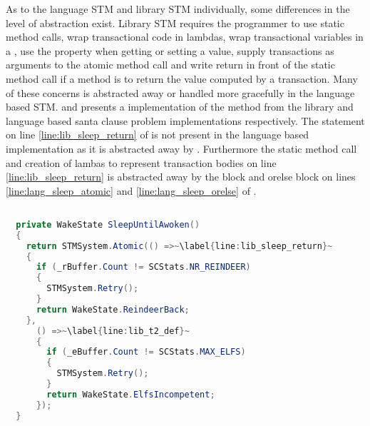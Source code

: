 As to the language \ac{STM} and library \ac{STM} individually, some differences in the level of abstraction exist. Library \ac{STM} requires the programmer to use static method calls, wrap transactional code in lambdas, wrap transactional variables in a , use the  property when getting or setting a value, supply  transactions as arguments to the atomic method call and write return in front of the static method call if a method is to return the value computed by a transaction. Many of these concerns is abstracted away or handled more gracefully in the language based \ac{STM}.    and  presents a implementation of the  method from the library and language based santa clause problem implementations respectively. The  statement on line \ref{line:lib_sleep_return} of  is not present in the language based implementation as it is abstracted away by \stmnamesp. Furthermore the static method call and creation of lambas to represent transaction bodies on line \ref{line:lib_sleep_return} is abstracted away by the  block and orelse block on lines \ref{line:lang_sleep_atomic} and \ref{line:lang_sleep_orelse} of .

\begin{lstlisting}[label=lst:lib_SleepUntilAwoken,
  caption={\bscode{SleepUntilAwoken} Method - \ac{STM} Library},
  language=Java,  
  showspaces=false,
  showtabs=false,
  breaklines=true,
  showstringspaces=false,
  breakatwhitespace=true,
  escapechar=~,
  commentstyle=\color{greencomments},
  keywordstyle=\color{bluekeywords},
  stringstyle=\color{redstrings},
  morekeywords={atomic, retry, orelse, var, get, set, ref, out}]  % Start your code-block

  private WakeState SleepUntilAwoken()
  {
    return STMSystem.Atomic(() =>~\label{line:lib_sleep_return}~
    {
      if (_rBuffer.Count != SCStats.NR_REINDEER)
      {
        STMSystem.Retry();
      }
      return WakeState.ReindeerBack;
    },
      () =>~\label{line:lib_t2_def}~
      {
        if (_eBuffer.Count != SCStats.MAX_ELFS)
        {
          STMSystem.Retry();
        }
        return WakeState.ElfsIncompetent;
      });
  }
\end{lstlisting}

